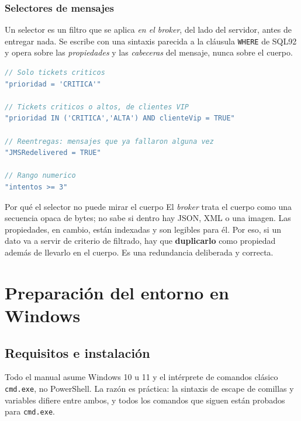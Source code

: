 \documentclass[11pt,a4paper]{book}
\begin{document}
\section{Selectores de mensajes}

Un selector es un filtro que se aplica \emph{en el broker}, del lado del servidor, antes de entregar nada.
Se escribe con una sintaxis parecida a la cláusula \texttt{WHERE} de SQL92 y opera sobre las \emph{propiedades} y las \emph{cabeceras} del mensaje, nunca sobre el cuerpo.

\begin{lstlisting}[language=Java,caption={Ejemplos de selectores},label={lst:selectores}]
// Solo tickets criticos
"prioridad = 'CRITICA'"

// Tickets criticos o altos, de clientes VIP
"prioridad IN ('CRITICA','ALTA') AND clienteVip = TRUE"

// Reentregas: mensajes que ya fallaron alguna vez
"JMSRedelivered = TRUE"

// Rango numerico
"intentos >= 3"
\end{lstlisting}

\begin{cajaTip}{Por qué el selector no puede mirar el cuerpo}
	El \emph{broker} trata el cuerpo como una secuencia opaca de bytes; no sabe si dentro hay JSON, XML o una imagen.
	Las propiedades, en cambio, están indexadas y son legibles para él.
	Por eso, si un dato va a servir de criterio de filtrado, hay que \textbf{duplicarlo} como propiedad además de llevarlo en el cuerpo.
	Es una redundancia deliberada y correcta.
\end{cajaTip}

\part{Preparación del entorno en Windows}
\label{parte:entorno}

\chapter{Requisitos e instalación}
\label{cap:entorno}

Todo el manual asume Windows 10 u 11 y el intérprete de comandos clásico \texttt{cmd.exe}, no PowerShell.
La razón es práctica: la sintaxis de escape de comillas y variables difiere entre ambos, y todos los comandos que siguen están probados para \texttt{cmd.exe}.
\end{document}
